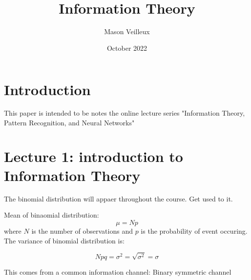 \documentclass{article}
\title{Information Theory}
\author{Mason Veilleux}
\date{October 2022}
\begin{document}
\maketitle

\section{Introduction}

This paper is intended to be notes the online lecture series "Information Theory, Pattern Recognition, and Neural Networks"


\section{Lecture 1: introduction to Information Theory}

The binomial distribution will appaer throughout the course. Get used to it.

Mean of binaomial distribution:
\begin{equation}
    \mu = Np
\end{equation}
 where $N$ is the number of observations and $p$ is the probability of event occuring. The variance of binomial distribution is:

 \begin{equation}
    Npq = \sigma^2 = \sqrt{\sigma^2} = \sigma
 \end{equation}


This comes from a common information channel: Binary symmetric channel
\end{document}
